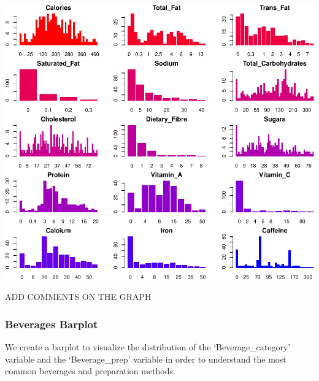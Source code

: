 \documentclass[
]{article}
\newenvironment{Shaded}{\begin{snugshade}}{\end{snugshade}}
\newcommand{\AttributeTok}[1]{\textcolor[rgb]{0.13,0.29,0.53}{#1}}
\newcommand{\DecValTok}[1]{\textcolor[rgb]{0.00,0.00,0.81}{#1}}
\newcommand{\FloatTok}[1]{\textcolor[rgb]{0.00,0.00,0.81}{#1}}
\newcommand{\FunctionTok}[1]{\textcolor[rgb]{0.13,0.29,0.53}{\textbf{#1}}}
\newcommand{\NormalTok}[1]{#1}
\newcommand{\SpecialCharTok}[1]{\textcolor[rgb]{0.81,0.36,0.00}{\textbf{#1}}}
\newcommand{\StringTok}[1]{\textcolor[rgb]{0.31,0.60,0.02}{#1}}
\begin{document}
\begin{center}\includegraphics{Statistical_Learning_Final_Report_files/figure-latex/barplot-1} \end{center}

ADD COMMENTS ON THE GRAPH

\subsubsection{Beverages Barplot}\label{beverages-barplot}

We create a barplot to visualize the distribution of the
`Beverage\_category' variable and the `Beverage\_prep' variable in order
to understand the most common beverages and preparation methods.

\begin{Shaded}
\end{Shaded}
\end{document}
